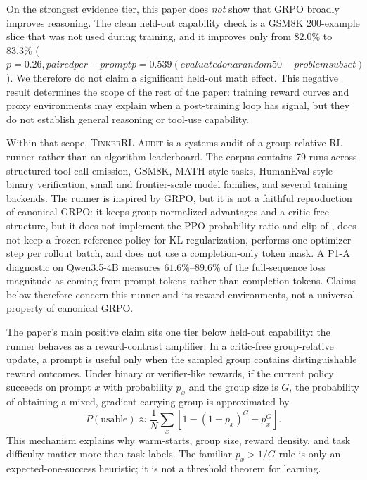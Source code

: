 \documentclass[12pt,a4paper]{report}
\newcommand{\ours}{\textsc{TinkerRL Audit}}
\begin{document}
On the strongest evidence tier, this paper does \emph{not} show that GRPO
broadly improves reasoning.  The clean held-out capability check is a GSM8K
200-example slice that was not used during training, and it improves only from
$82.0\%$ to $83.3\%$ ($p=0.26, paired per-prompt p=0.539 (evaluated on a random 50-problem subset)$).  We therefore do not claim a significant
held-out math effect.  This negative result determines the scope of the rest of
the paper: training reward curves and proxy environments may explain when a
post-training loop has signal, but they do not establish general reasoning or
tool-use capability.

Within that scope, \ours{} is a systems audit of a group-relative RL runner
rather than an algorithm leaderboard.  The corpus contains 79 runs across
structured tool-call emission, GSM8K, MATH-style tasks, HumanEval-style binary
verification, small and frontier-scale model families, and several training
backends.  The runner is inspired by GRPO, but it is not a faithful reproduction
of canonical GRPO: it keeps group-normalized advantages and a critic-free
structure, but it does not implement the PPO probability ratio and clip of
\citet{schulman2017ppo}, does not keep a frozen reference policy for KL
regularization, performs one optimizer step per rollout batch, and does not use
a completion-only token mask.  A P1-A diagnostic on Qwen3.5-4B measures
$61.6\%$--$89.6\%$ of the full-sequence loss magnitude as coming from prompt
tokens rather than completion tokens.  Claims below therefore concern this
runner and its reward environments, not a universal property of canonical GRPO.

The paper's main positive claim sits one tier below held-out capability: the
runner behaves as a reward-contrast amplifier.  In a critic-free group-relative
update, a prompt is useful only when the sampled group contains distinguishable
reward outcomes.  Under binary or verifier-like rewards, if the current policy
succeeds on prompt $x$ with probability $p_x$ and the group size is $G$, the
probability of obtaining a mixed, gradient-carrying group is approximated by
\[
P(\text{usable}) \approx \frac{1}{N}\sum_x \left[1 - (1-p_x)^G - p_x^G\right].
\]
This mechanism explains why warm-starts, group size, reward density, and task
difficulty matter more than task labels.  The familiar $p_x > 1/G$ rule is only
an expected-one-success heuristic; it is not a threshold theorem for learning.
\end{document}
